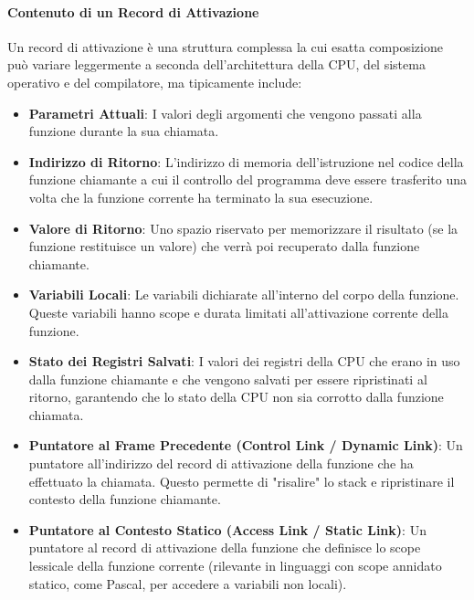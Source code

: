 \paragraph{Contenuto di un Record di Attivazione}
Un record di attivazione è una struttura complessa la cui esatta composizione può variare leggermente a seconda dell'architettura della CPU, del sistema operativo e del compilatore, ma tipicamente include:
\begin{itemize}
    \item \textbf{Parametri Attuali}: I valori degli argomenti che vengono passati alla funzione durante la sua chiamata.
    \item \textbf{Indirizzo di Ritorno}: L'indirizzo di memoria dell'istruzione nel codice della funzione chiamante a cui il controllo del programma deve essere trasferito una volta che la funzione corrente ha terminato la sua esecuzione.
    \item \textbf{Valore di Ritorno}: Uno spazio riservato per memorizzare il risultato (se la funzione restituisce un valore) che verrà poi recuperato dalla funzione chiamante.
    \item \textbf{Variabili Locali}: Le variabili dichiarate all'interno del corpo della funzione. Queste variabili hanno scope e durata limitati all'attivazione corrente della funzione.
    \item \textbf{Stato dei Registri Salvati}: I valori dei registri della CPU che erano in uso dalla funzione chiamante e che vengono salvati per essere ripristinati al ritorno, garantendo che lo stato della CPU non sia corrotto dalla funzione chiamata.
    \item \textbf{Puntatore al Frame Precedente (Control Link / Dynamic Link)}: Un puntatore all'indirizzo del record di attivazione della funzione che ha effettuato la chiamata. Questo permette di "risalire" lo stack e ripristinare il contesto della funzione chiamante.
    \item \textbf{Puntatore al Contesto Statico (Access Link / Static Link)}: Un puntatore al record di attivazione della funzione che definisce lo scope lessicale della funzione corrente (rilevante in linguaggi con scope annidato statico, come Pascal, per accedere a variabili non locali).
\end{itemize}

